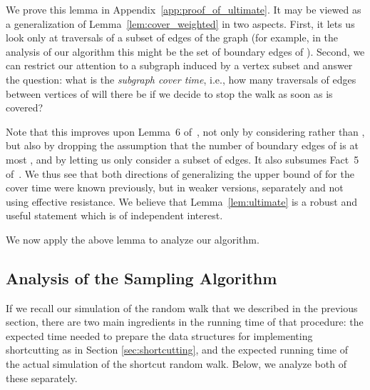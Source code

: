 \documentclass[11pt, letterpaper]{article}
\begin{document}
We prove this lemma in Appendix~\ref{app:proof_of_ultimate}. It may be viewed as a generalization of Lemma~\ref{lem:cover_weighted} in two aspects. First, it lets us look only at traversals of a subset of edges of the graph (for example, in the analysis of our algorithm this might be the set of boundary edges of ). Second, we can restrict our attention to a subgraph induced by a vertex subset  and answer the question: what is the {\em subgraph cover time}, i.e., how many traversals of edges between vertices of  will there be if we decide to stop the walk as soon as  is covered? 

Note that this improves upon Lemma~6 of~\cite{KelnerM09}, not only by considering  rather than , but also by dropping the assumption that the number of boundary edges of  is at most , and by letting us only consider a subset of edges. It also subsumes Fact~5 of~\cite{KelnerM09}. We thus see that both directions of generalizing the upper bound of  for the cover time were known previously, but in weaker versions, separately and not using effective resistance. We believe that Lemma~\ref{lem:ultimate} is a robust and useful statement which is of independent interest.

We now apply the above lemma to analyze our algorithm.

\subsection{Analysis of the Sampling Algorithm}\label{sec:analysis_sampling}

If we recall our simulation of the random walk that we described in the previous section, there are two main ingredients in the running time of that procedure: the expected time needed to prepare the data structures for implementing shortcutting as in Section \ref{sec:shortcutting}, and the expected running time of the actual simulation of the shortcut random walk. Below, we analyze both of these separately.
\end{document}

